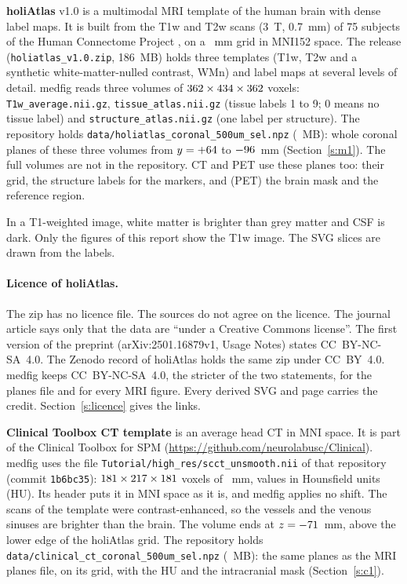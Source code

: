 \documentclass[10pt,a4paper]{article}
\newcommand{\code}[1]{\texttt{#1}}
\begin{document}
\textbf{holiAtlas} v1.0 \cite{manjon2026} is a multimodal MRI template of the human brain with dense label maps. It is built
from the T1w and T2w scans (3~T, \SI{0.7}{\milli\metre}) of 75 subjects of the Human Connectome Project \cite{vanessen2013}, on
a \mVoxel~mm grid in MNI152 space. The release (\nolinkurl{holiatlas_v1.0.zip}, 186~MB) holds three templates (T1w, T2w and a
synthetic white-matter-nulled contrast, WMn) and label maps at several levels of detail. medfig reads three volumes of
$362\times434\times362$ voxels: \nolinkurl{T1w_average.nii.gz},
\nolinkurl{tissue_atlas.nii.gz} (tissue labels 1 to 9; 0 means no tissue label) and
\nolinkurl{structure_atlas.nii.gz} (one label per structure). The repository holds
\nolinkurl{data/holiatlas_coronal_500um_sel.npz} (\mPlanesMB~MB): \mNPlanes{} whole coronal planes of these three volumes from
$y=+64$ to $-96$~mm (Section~\ref{s:m1}). The full volumes are not in the repository.
CT and PET use these planes too: their grid, the structure labels for the markers, and (PET) the brain mask and the
reference region.

In a T1-weighted image, white matter is brighter than grey matter and CSF is dark. Only the figures of this report show the
T1w image. The SVG slices are drawn from the labels.

\paragraph{Licence of holiAtlas.} The zip has no licence file. The sources do not agree on the licence. The journal article
\cite{manjon2026} says only that the data are ``under a Creative Commons license''. The first version of the preprint
(arXiv:2501.16879v1, Usage Notes) states CC~BY-NC-SA~4.0. The Zenodo record of holiAtlas holds the same zip under
CC~BY~4.0. medfig keeps CC~BY-NC-SA~4.0, the stricter of the two statements, for the planes file and for every MRI figure.
Every derived SVG and page carries the credit. Section~\ref{s:licence} gives the links.

\medskip\noindent
\textbf{Clinical Toolbox CT template} \cite{rorden2012} is an average head CT in MNI space. It is part of the Clinical
Toolbox for SPM (\url{https://github.com/neurolabusc/Clinical}). medfig uses the file
\nolinkurl{Tutorial/high_res/scct_unsmooth.nii} of that repository (commit \code{1b6bc35}): $181\times217\times181$
voxels of \ctVolVs~mm, values in Hounsfield units (HU). Its header puts it in MNI space as it is, and medfig applies no shift.
The scans of the template were contrast-enhanced, so the vessels and the venous sinuses are brighter than the brain. The volume
ends at $z=-71$~mm, above the lower edge of the holiAtlas grid. The repository holds
\nolinkurl{data/clinical_ct_coronal_500um_sel.npz} (\ctPlanesMB~MB): the same \ctNPlanes{} planes as the MRI planes file, on its
grid, with the HU and the intracranial mask (Section~\ref{s:c1}).
\end{document}
